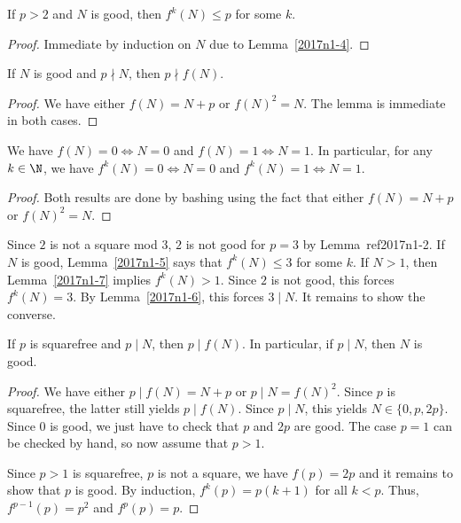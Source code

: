 \begin{lemma}\label{2017n1-5}
If $p > 2$ and $N$ is good, then $f^k(N) \leq p$ for some $k$.
\end{lemma}
\begin{proof}
Immediate by induction on $N$ due to Lemma~\ref{2017n1-4}.
\end{proof}

\begin{lemma}\label{2017n1-6}
If $N$ is good and $p \nmid N$, then $p \nmid f(N)$.
\end{lemma}
\begin{proof}
We have either $f(N) = N + p$ or $f(N)^2 = N$.
The lemma is immediate in both cases.
\end{proof}

\begin{lemma}\label{2017n1-7}
We have $f(N) = 0 \iff N = 0$ and $f(N) = 1 \iff N = 1$.
In particular, for any $k \in \N$, we have $f^k(N) = 0 \iff N = 0$ and $f^k(N) = 1 \iff N = 1$.
\end{lemma}
\begin{proof}
Both results are done by bashing using the fact that either $f(N) = N + p$ or $f(N)^2 = N$.
\end{proof}

Since $2$ is not a square mod $3$, $2$ is not good for $p = 3$ by Lemma~ref{2017n1-2}.
If $N$ is good, Lemma~\ref{2017n1-5} says that $f^k(N) \leq 3$ for some $k$.
If $N > 1$, then Lemma~\ref{2017n1-7} implies $f^k(N) > 1$.
Since $2$ is not good, this forces $f^k(N) = 3$.
By Lemma~\ref{2017n1-6}, this forces $3 \mid N$.
It remains to show the converse.

\begin{lemma}\label{2017n1-8}
If $p$ is squarefree and $p \mid N$, then $p \mid f(N)$.
In particular, if $p \mid N$, then $N$ is good.
\end{lemma}
\begin{proof}
We have either $p \mid f(N) = N + p$ or $p \mid N = f(N)^2$.
Since $p$ is squarefree, the latter still yields $p \mid f(N)$.
Since $p \mid N$, this yields $N \in \{0, p, 2p\}$.
Since $0$ is good, we just have to check that $p$ and $2p$ are good.
The case $p = 1$ can be checked by hand, so now assume that $p > 1$.

Since $p > 1$ is squarefree, $p$ is not a square, we have $f(p) = 2p$ and it remains to show that $p$ is good.
By induction, $f^k(p) = p(k + 1)$ for all $k < p$.
Thus, $f^{p - 1}(p) = p^2$ and $f^p(p) = p$.
\end{proof}



